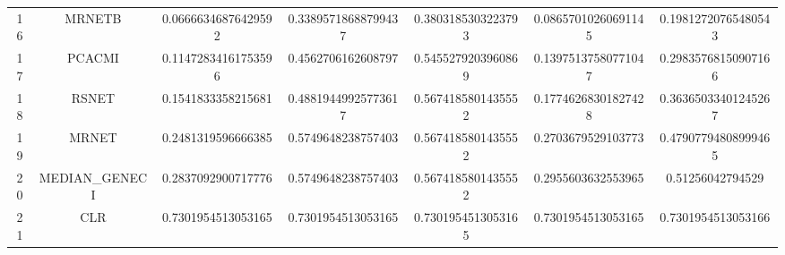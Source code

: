 \documentclass[a4paper,10pt]{article}
\begin{document}
\begin{landscape}
\begin{table}[!htp]
\begin{tabular}{ccccccc}
16&MRNETB&0.06666346876429592&0.33895718688799437&0.3803185303223793&0.08657010260691145&0.19812720765480543\\
17&PCACMI&0.11472834161753596&0.4562706162608797&0.5455279203960869&0.13975137580771047&0.29835768150907166\\
18&RSNET&0.1541833358215681&0.48819449925773617&0.5674185801435552&0.17746268301827428&0.36365033401245267\\
19&MRNET&0.2481319596666385&0.5749648238757403&0.5674185801435552&0.2703679529103773&0.47907794808999465\\
20&MEDIAN_GENECI&0.2837092900717776&0.5749648238757403&0.5674185801435552&0.2955603632553965&0.51256042794529\\
21&CLR&0.7301954513053165&0.7301954513053165&0.7301954513053165&0.7301954513053165&0.7301954513053166\\
\hline
\end{tabular}
\end{table}


\newpage


\end{landscape}
\end{document}
